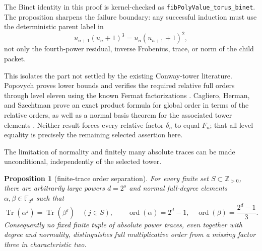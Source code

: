 \documentclass[11pt]{article}
\newtheorem{proposition}[theorem]{Proposition}
\theoremstyle{definition}
\theoremstyle{remark}
\begin{document}
The Binet identity in this proof is kernel-checked as
\texttt{fibPolyValue\_torus\_binet}.  The proposition sharpens the failure
boundary: any successful induction must use the deterministic parent label
in
\[
 u_{n+1}(u_n+1)^3=u_n(u_{n+1}+1)^2,
\]
not only the fourth-power residual, inverse Frobenius, trace, or norm of the
child packet.

This isolates the part not settled by the existing Conway-tower literature.
Popovych proves lower bounds and verifies the required relative full orders
through level eleven using the known Fermat factorizations
\cite{popovych2018}.  Cagliero, Herman, and Szechtman prove an exact product
formula for global order in terms of the relative orders, as well as a normal
basis theorem for the associated tower elements
\cite{caglierohermanszechtman2025}.  Neither result forces every relative
factor $\delta_n$ to equal $F_n$; that all-level equality is precisely the
remaining selected assertion here.

The limitation of normality and finitely many absolute traces can be made
unconditional, independently of the selected tower.

\begin{proposition}[finite-trace order separation]
\label{prop:z-trace-separation}
For every finite set $S\subset\mathbb Z_{>0}$, there are arbitrarily large
powers $d=2^s$ and normal full-degree elements
$\alpha,\beta\in\mathbb F_{2^d}$ such that
\[
 \operatorname{Tr}(\alpha^j)=\operatorname{Tr}(\beta^j)
 \quad(j\in S),
 \qquad
 \operatorname{ord}(\alpha)=2^d-1,
 \quad
 \operatorname{ord}(\beta)=\frac{2^d-1}{3}.
\]
Consequently no fixed finite tuple of absolute power traces, even together
with degree and normality, distinguishes full multiplicative order from a
missing factor three in characteristic two.
\end{proposition}
\end{document}

